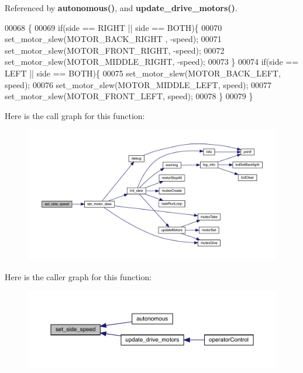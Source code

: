 Referenced by \textbf{ autonomous()}, and \textbf{ update\+\_\+drive\+\_\+motors()}.


\begin{DoxyCode}
00068                                            \{
00069   \textcolor{keywordflow}{if}(side == RIGHT || side == BOTH)\{
00070     set_motor_slew(MOTOR_BACK_RIGHT , -speed);
00071     set_motor_slew(MOTOR_FRONT_RIGHT, -speed);
00072     set_motor_slew(MOTOR_MIDDLE_RIGHT, -speed);
00073   \}
00074   \textcolor{keywordflow}{if}(side == LEFT || side == BOTH)\{
00075     set_motor_slew(MOTOR_BACK_LEFT, speed);
00076     set_motor_slew(MOTOR_MIDDLE_LEFT, speed);
00077     set_motor_slew(MOTOR_FRONT_LEFT, speed);
00078   \}
00079 \}
\end{DoxyCode}
Here is the call graph for this function\+:\nopagebreak
\begin{figure}[H]
\begin{center}
\leavevmode
\includegraphics[width=350pt]{drive_8h_a8df41fd50094c065eedc81fc5e6595d1_cgraph}
\end{center}
\end{figure}
Here is the caller graph for this function\+:\nopagebreak
\begin{figure}[H]
\begin{center}
\leavevmode
\includegraphics[width=350pt]{drive_8h_a8df41fd50094c065eedc81fc5e6595d1_icgraph}
\end{center}
\end{figure}
\mbox{\label{drive_8h_a53d6e35d53ec3e0b1b1c489d8203f204}} 
